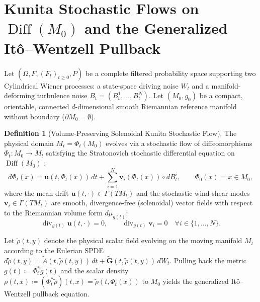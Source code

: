 \documentclass[11pt,a4paper,reqno]{article}
\def\mathrm#1{#1}%
\def\mathcal#1{#1}%
\def\mathbb#1{#1}%
\theoremstyle{plain}
\theoremstyle{definition}
\newtheorem{definition}[theorem]{Definition}
\theoremstyle{remark}
\numberwithin{equation}{section}
\begin{document}
\section{Kunita Stochastic Flows on \texorpdfstring{$\operatorname{Diff}(\mathcal{M}_0)$}{Diff(M0)} and the Generalized It\^o--Wentzell Pullback}
\label{sec:kunita_pullback}

Let $(\Omega, \mathcal{F}, (\mathcal{F}_t)_{t \ge 0}, \mathbb{P})$ be a complete filtered probability space supporting two Cylindrical Wiener processes: a state-space driving noise $W_t$ and a manifold-deforming turbulence noise $B_t = (B_t^1, \dots, B_t^N)$. Let $(\mathcal{M}_0, g_0)$ be a compact, orientable, connected $d$-dimensional smooth Riemannian reference manifold without boundary ($\partial\mathcal{M}_0 = \emptyset$).

\begin{definition}[Volume-Preserving Solenoidal Kunita Stochastic Flow]
The physical domain $\mathcal{M}_t = \Phi_t(\mathcal{M}_0)$ evolves via a stochastic flow of diffeomorphisms $\Phi_t : \mathcal{M}_0 \to \mathcal{M}_t$ satisfying the Stratonovich stochastic differential equation on $\operatorname{Diff}(\mathcal{M}_0)$ \cite{kunita1990stochastic, baxendale1984brownian}:
\begin{equation}\label{eq:kunita_flow}
  \mathrm{d}\Phi_t(x) = \mathbf{u}(t, \Phi_t(x))\,\mathrm{d}t + \sum_{i=1}^N \mathbf{v}_i(\Phi_t(x)) \circ \mathrm{d}B_t^i, \qquad \Phi_0(x) = x \in \mathcal{M}_0,
\end{equation}
where the mean drift $\mathbf{u}(t,\cdot) \in \Gamma(T\mathcal{M}_t)$ and the stochastic wind-shear modes $\mathbf{v}_i \in \Gamma(T\mathcal{M}_t)$ are smooth, divergence-free (solenoidal) vector fields with respect to the Riemannian volume form $\mathrm{d}\mu_{g(t)}$:
\begin{equation}\label{eq:solenoidal_cond}
  \operatorname{div}_{g(t)} \mathbf{u}(t, \cdot) = 0, \qquad \operatorname{div}_{g(t)} \mathbf{v}_i = 0 \quad \forall i \in \{1, \dots, N\}.
\end{equation}
\end{definition}

Let $\tilde{\rho}(t, y)$ denote the physical scalar field evolving on the moving manifold $\mathcal{M}_t$ according to the Eulerian SPDE $\mathrm{d}\tilde{\rho}(t,y) = \tilde{A}(t,\tilde{\rho}(t,y))\,\mathrm{d}t + \tilde{\mathbf{G}}(t,\tilde{\rho}(t,y))\,\mathrm{d}W_t$. Pulling back the metric $g(t) \coloneqq \Phi_t^* \tilde{g}(t)$ and the scalar density $\rho(t, x) \coloneqq (\Phi_t^* \tilde{\rho})(t, x) = \tilde{\rho}(t, \Phi_t(x))$ to $\mathcal{M}_0$ yields the generalized It\^o--Wentzell pullback equation.
\end{document}
